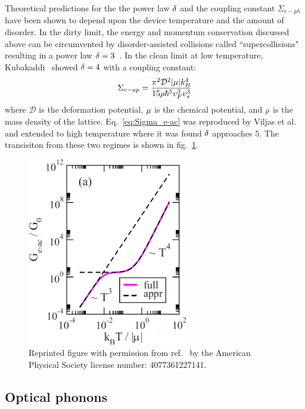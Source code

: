 Theoretical predictions for the the power law $\mathrm{\delta}$ and the coupling constant $\Sigma_{e-ph}$ have been shown to depend upon the device temperature and the amount of disorder. In the dirty limit, the energy and momentum conservation discussed above can be circumvented by disorder-assisted collisions called ``supercollisions" resulting in a  power law $\mathrm{\delta}=3$~\cite{song_disorder-assisted_2012}. In the clean limit at low temperature, Kubakaddi~\cite{kubakaddi_interaction_2009} showed $\mathrm{\delta} = 4$ with a coupling constant:
\begin{equation}\label{eq:Sigma_e-ac}
\Sigma_{e-ap}=\frac{\pi^2\mathcal{D}^2\lvert\mathrm{\mu}\rvert k_B^4}{15\mathrm{\rho}\hbar^5v_F^3v_s^3}
\end{equation}
where $\mathcal{D}$ is the deformation potential, $\mathrm{\mu}$ is the chemical potential, and $\mathrm{\rho}$ is the mass density of the lattice.
Eq.~\ref{eq:Sigma_e-ac} was reproduced by
Viljas et al.~\cite{viljas_electron-phonon_2010} and extended to high temperature where it was found $\mathrm{\delta}$ approaches $5$. The transisiton from these two regimes is shown in fig.~\ref{fig:viljas2010}.
\begin{figure}
\centering
\includegraphics[width = 70mm]{figures/electronic_cooling/Viljas2010_conduction.png}
\caption{
Reprinted figure with permission from
ref.~\cite{viljas_electron-phonon_2010} by the American Physical Society license number: 4077361227141.}
\label{fig:viljas2010}
\end{figure}


\subsection{Optical phonons}

